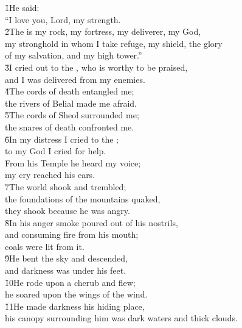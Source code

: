 \begin{poetry}
\poeml \v{1}He said: \\
\poemll    ``I love you, Lord, my strength. \\
\poeml \v{2}The  is my rock, my fortress, my deliverer, my God, \\
\poemll    my stronghold in whom I take refuge, my shield, the glory \\
\poemlll       of my salvation, and my high tower.'' \\
\poeml \v{3}I cried out to the , who is worthy to be praised, \\
\poemll    and I was delivered from my enemies. \\
\poeml \v{4}The cords of death entangled me; \\
\poemll    the rivers of Belial made me afraid. \\
\poeml \v{5}The cords of Sheol surrounded me; \\
\poemll    the snares of death confronted me. \\
\poeml \v{6}In my distress I cried to the ; \\
\poemll    to my God I cried for help. \\
\poeml From his Temple he heard my voice; \\
\poemll    my cry reached his ears. \\
\poeml \v{7}The world shook and trembled; \\
\poemll    the foundations of the mountains quaked, \\
\poemlll       they shook because he was angry. \\
\poeml \v{8}In his anger smoke poured out of his nostrils, \\
\poemll    and consuming fire from his mouth; \\
\poemlll       coals were lit from it. \\
\poeml \v{9}He bent the sky and descended, \\
\poemll    and darkness was under his feet. \\
\poeml \v{10}He rode upon a cherub and flew; \\
\poemll    he soared upon the wings of the wind. \\
\poeml \v{11}He made darkness his hiding place, \\
\poemll    his canopy surrounding him was dark waters and thick clouds. \\

\end{poetry}
